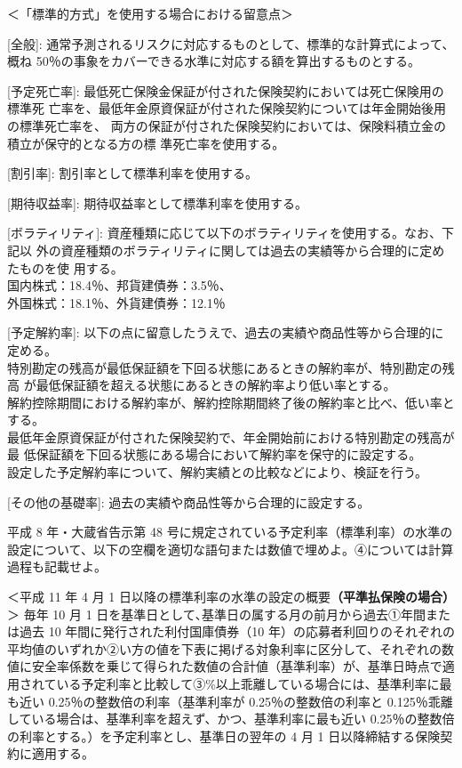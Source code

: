 \documentclass[report,gutter=10mm,fore-edge=10mm,uplatex,dvipdfmx]{jlreq}
\begin{document}
＜「標準的方式」を使用する場合における留意点＞

[全般]: 通常予測されるリスクに対応するものとして、標準的な計算式によって、概ね
50％の事象をカバーできる水準に対応する額を算出するものとする。

[予定死亡率]: 最低死亡保険金保証が付された保険契約においては死亡保険用の標準死
亡率を、最低年金原資保証が付された保険契約については年金開始後用の標準死亡率を、
両方の保証が付された保険契約においては、保険料積立金の積立が保守的となる方の標
準死亡率を使用する。

[割引率]: 割引率として標準利率を使用する。

[期待収益率]: 期待収益率として標準利率を使用する。

[ボラティリティ]: 資産種類に応じて以下のボラティリティを使用する。なお、下記以
外の資産種類のボラティリティに関しては過去の実績等から合理的に定めたものを使
用する。\\
国内株式：18.4％、邦貨建債券：3.5％、\\
外国株式：18.1％、外貨建債券：12.1％

[予定解約率]: 以下の点に留意したうえで、過去の実績や商品性等から合理的に定める。\\
特別勘定の残高が最低保証額を下回る状態にあるときの解約率が、特別勘定の残高
が最低保証額を超える状態にあるときの解約率より低い率とする。\\
解約控除期間における解約率が、解約控除期間終了後の解約率と比べ、低い率とする。\\
最低年金原資保証が付された保険契約で、年金開始前における特別勘定の残高が最
低保証額を下回る状態にある場合において解約率を保守的に設定する。\\
設定した予定解約率について、解約実績との比較などにより、検証を行う。

[その他の基礎率]: 過去の実績や商品性等から合理的に設定する。


平成 8 年・大蔵省告示第 48
号に規定されている予定利率（標準利率）の水準の設定について、以下の空欄を適切な語句または数値で埋めよ。④については計算過程も記載せよ。

＜平成 11 年 4 月 1
日以降の標準利率の水準の設定の概要\textbf{（平準払保険の場合）}＞ 毎年
10 月 1 日を基準日として､基準日の属する月の前月から過去①年間または過去
10 年間に発行された利付国庫債券（10
年）の応募者利回りのそれぞれの平均値のいずれか②い方の値を下表に掲げる対象利率に区分して、それぞれの数値に安全率係数を乗じて得られた数値の合計値（基準利率）が、基準日時点で適用されている予定利率と比較して③\%以上乖離している場合には、基準利率に最も近い
0.25％の整数倍の利率（基準利率が 0.25％の整数倍の利率と
0.125％乖離している場合は、基準利率を超えず、かつ、基準利率に最も近い
0.25％の整数倍の利率とする。）を予定利率とし、基準日の翌年の 4 月 1
日以降締結する保険契約に適用する。
\end{document}
